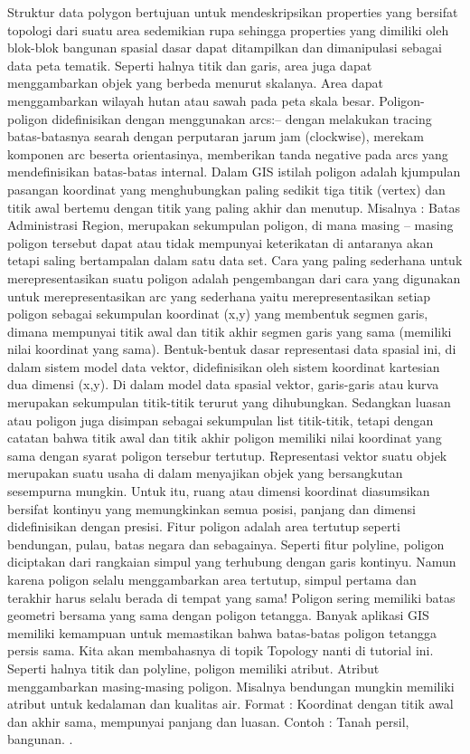 Struktur data polygon bertujuan untuk mendeskripsikan properties yang bersifat topologi dari suatu area sedemikian rupa sehingga properties yang dimiliki oleh blok-blok bangunan spasial dasar dapat ditampilkan dan dimanipulasi sebagai data peta tematik. Seperti halnya titik dan garis, area juga dapat menggambarkan objek yang berbeda menurut skalanya. Area dapat menggambarkan wilayah hutan atau sawah pada peta skala besar.  Poligon-poligon didefinisikan dengan menggunakan arcs:-- dengan melakukan tracing batas-batasnya searah dengan perputaran jarum jam (clockwise), merekam komponen arc beserta orientasinya, memberikan tanda negative pada arcs yang mendefinisikan batas-batas internal.  
Dalam GIS istilah poligon adalah kjumpulan pasangan koordinat yang menghubungkan paling sedikit tiga titik (vertex) dan titik awal bertemu dengan titik yang paling akhir dan menutup. Misalnya : Batas Administrasi
Region, merupakan sekumpulan poligon, di mana masing – masing poligon tersebut dapat atau tidak mempunyai keterikatan di antaranya akan tetapi saling bertampalan dalam satu data set.
Cara yang paling sederhana untuk merepresentasikan suatu poligon adalah pengembangan dari cara yang digunakan untuk merepresentasikan arc yang sederhana yaitu merepresentasikan setiap poligon sebagai sekumpulan koordinat (x,y) yang membentuk segmen garis, dimana mempunyai titik awal dan titik akhir segmen garis yang sama (memiliki nilai koordinat yang sama). Bentuk-bentuk dasar representasi data spasial ini, di dalam sistem model data vektor, didefinisikan oleh sistem koordinat kartesian dua dimensi (x,y). Di dalam model data spasial vektor, garis-garis atau kurva merupakan sekumpulan titik-titik terurut yang dihubungkan. Sedangkan luasan atau poligon juga disimpan sebagai sekumpulan list titik-titik, tetapi dengan catatan bahwa titik awal dan titik akhir poligon memiliki nilai koordinat yang sama dengan syarat poligon tersebur tertutup. Representasi vektor suatu objek merupakan suatu usaha di dalam menyajikan objek yang bersangkutan sesempurna mungkin. Untuk itu, ruang atau dimensi koordinat diasumsikan bersifat kontinyu yang memungkinkan semua posisi, panjang dan dimensi didefinisikan dengan presisi.
Fitur poligon adalah area tertutup seperti bendungan, pulau, batas negara dan sebagainya. Seperti fitur polyline, poligon diciptakan dari rangkaian simpul yang terhubung dengan garis kontinyu. Namun karena poligon selalu menggambarkan area tertutup, simpul pertama dan terakhir harus selalu berada di tempat yang sama! Poligon sering memiliki batas geometri bersama yang sama dengan poligon tetangga. Banyak aplikasi GIS memiliki kemampuan untuk memastikan bahwa batas-batas poligon tetangga persis sama. Kita akan membahasnya di topik Topology nanti di tutorial ini. Seperti halnya titik dan polyline, poligon memiliki atribut. Atribut menggambarkan masing-masing poligon. Misalnya bendungan mungkin memiliki atribut untuk kedalaman dan kualitas air. Format : Koordinat dengan titik awal dan akhir sama, mempunyai panjang dan luasan. Contoh : Tanah persil, bangunan. \cite{mahendra2014sistem}.
